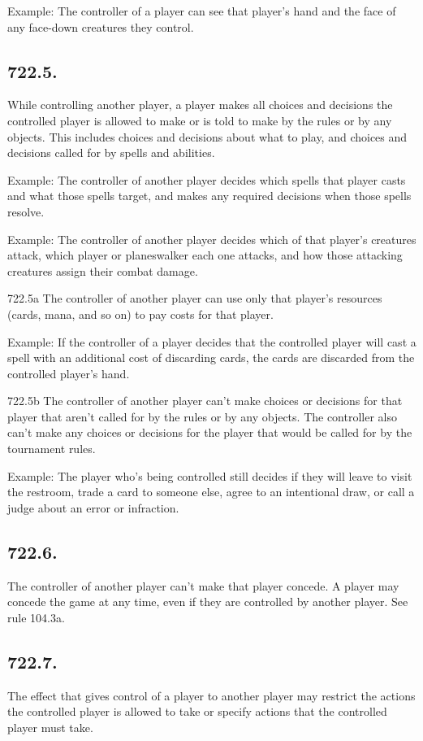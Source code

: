 Example: The controller of a player can see that player’s hand and the face of any face-down creatures they control.

\subsection*{722.5.}
While controlling another player, a player makes all choices and decisions the controlled player is allowed to make or is told to make by the rules or by any objects. This includes choices and decisions about what to play, and choices and decisions called for by spells and abilities.

Example: The controller of another player decides which spells that player casts and what those spells target, and makes any required decisions when those spells resolve.

Example: The controller of another player decides which of that player’s creatures attack, which player or planeswalker each one attacks, and how those attacking creatures assign their combat damage.

722.5a The controller of another player can use only that player’s resources (cards, mana, and so on) to pay costs for that player.

Example: If the controller of a player decides that the controlled player will cast a spell with an additional cost of discarding cards, the cards are discarded from the controlled player’s hand.

722.5b The controller of another player can’t make choices or decisions for that player that aren’t called for by the rules or by any objects. The controller also can’t make any choices or decisions for the player that would be called for by the tournament rules.

Example: The player who’s being controlled still decides if they will leave to visit the restroom, trade a card to someone else, agree to an intentional draw, or call a judge about an error or infraction.

\subsection*{722.6.}
The controller of another player can’t make that player concede. A player may concede the game at any time, even if they are controlled by another player. See rule 104.3a.

\subsection*{722.7.}
The effect that gives control of a player to another player may restrict the actions the controlled player is allowed to take or specify actions that the controlled player must take.

